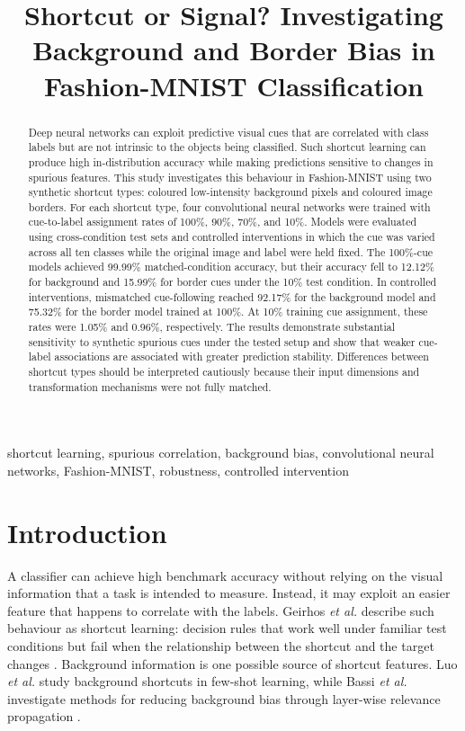 \documentclass[conference]{IEEEtran}
\title{Shortcut or Signal? Investigating Background and Border Bias in Fashion-MNIST Classification}
\author{
\IEEEauthorblockN{Prajwal Dutta}
\IEEEauthorblockA{
Deggendorf Institute of Technology\\
Campus Cham, Germany\\
Email: [insert institutional email]
}
}
\begin{document}
\maketitle

\begin{abstract}
Deep neural networks can exploit predictive visual cues that are correlated with class labels but are not intrinsic to the objects being classified. Such shortcut learning can produce high in-distribution accuracy while making predictions sensitive to changes in spurious features. This study investigates this behaviour in Fashion-MNIST using two synthetic shortcut types: coloured low-intensity background pixels and coloured image borders. For each shortcut type, four convolutional neural networks were trained with cue-to-label assignment rates of 100\%, 90\%, 70\%, and 10\%. Models were evaluated using cross-condition test sets and controlled interventions in which the cue was varied across all ten classes while the original image and label were held fixed. The 100\%-cue models achieved 99.99\% matched-condition accuracy, but their accuracy fell to 12.12\% for background and 15.99\% for border cues under the 10\% test condition. In controlled interventions, mismatched cue-following reached 92.17\% for the background model and 75.32\% for the border model trained at 100\%. At 10\% training cue assignment, these rates were 1.05\% and 0.96\%, respectively. The results demonstrate substantial sensitivity to synthetic spurious cues under the tested setup and show that weaker cue-label associations are associated with greater prediction stability. Differences between shortcut types should be interpreted cautiously because their input dimensions and transformation mechanisms were not fully matched.
\end{abstract}

\begin{IEEEkeywords}
shortcut learning, spurious correlation, background bias, convolutional neural networks, Fashion-MNIST, robustness, controlled intervention
\end{IEEEkeywords}

\section{Introduction}
A classifier can achieve high benchmark accuracy without relying on the visual information that a task is intended to measure. Instead, it may exploit an easier feature that happens to correlate with the labels. Geirhos \emph{et al.} describe such behaviour as shortcut learning: decision rules that work well under familiar test conditions but fail when the relationship between the shortcut and the target changes \cite{geirhos}. Background information is one possible source of shortcut features. Luo \emph{et al.} study background shortcuts in few-shot learning, while Bassi \emph{et al.} investigate methods for reducing background bias through layer-wise relevance propagation \cite{luo,bassi}.
\end{document}
